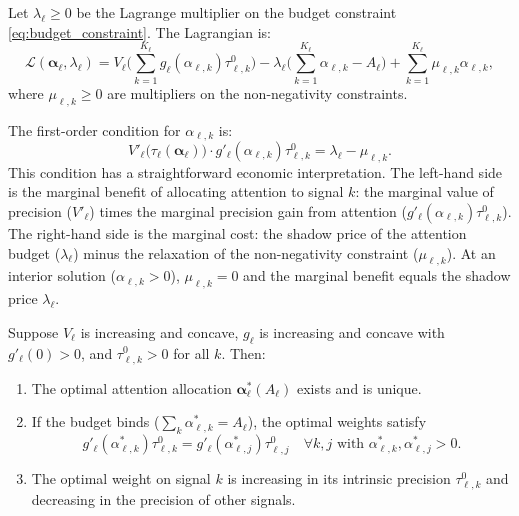 Let $\lambda_\ell \geq 0$ be the Lagrange multiplier on the budget constraint \eqref{eq:budget_constraint}. The Lagrangian is:
\begin{equation}\label{eq:lagrangian}
\mathcal{L}(\boldsymbol{\alpha}_\ell, \lambda_\ell) = V_\ell\Biggl(\sum_{k=1}^{K_\ell} g_\ell(\alpha_{\ell,k}) \tau^0_{\ell,k}\Biggr) - \lambda_\ell\Biggl(\sum_{k=1}^{K_\ell} \alpha_{\ell,k} - A_\ell\Biggr) + \sum_{k=1}^{K_\ell} \mu_{\ell,k} \alpha_{\ell,k},
\end{equation}
where $\mu_{\ell,k} \geq 0$ are multipliers on the non-negativity constraints.

The first-order condition for $\alpha_{\ell,k}$ is:
\begin{equation}\label{eq:foc}
V'_\ell\bigl(\tau_\ell(\boldsymbol{\alpha}_\ell)\bigr) \cdot g'_\ell(\alpha_{\ell,k}) \tau^0_{\ell,k} = \lambda_\ell - \mu_{\ell,k}.
\end{equation}
This condition has a straightforward economic interpretation. The left-hand side is the marginal benefit of allocating attention to signal $k$: the marginal value of precision ($V'_\ell$) times the marginal precision gain from attention ($g'_\ell(\alpha_{\ell,k}) \tau^0_{\ell,k}$). The right-hand side is the marginal cost: the shadow price of the attention budget ($\lambda_\ell$) minus the relaxation of the non-negativity constraint ($\mu_{\ell,k}$). At an interior solution ($\alpha_{\ell,k} > 0$), $\mu_{\ell,k} = 0$ and the marginal benefit equals the shadow price $\lambda_\ell$.

\begin{proposition}\label{prop:optimal_attention}
Suppose $V_\ell$ is increasing and concave, $g_\ell$ is increasing and concave with $g'_\ell(0) > 0$, and $\tau^0_{\ell,k} > 0$ for all $k$. Then:
\begin{enumerate}[label=(\roman*)]
\item The optimal attention allocation $\boldsymbol{\alpha}^*_\ell(A_\ell)$ exists and is unique.
\item If the budget binds ($\sum_k \alpha^*_{\ell,k} = A_\ell$), the optimal weights satisfy
\begin{equation}\label{eq:interior_foc}
g'_\ell(\alpha^*_{\ell,k}) \tau^0_{\ell,k} = g'_\ell(\alpha^*_{\ell,j}) \tau^0_{\ell,j} \quad \forall k,j \text{ with } \alpha^*_{\ell,k}, \alpha^*_{\ell,j} > 0.
\end{equation}
\item The optimal weight on signal $k$ is increasing in its intrinsic precision $\tau^0_{\ell,k}$ and decreasing in the precision of other signals.
\end{enumerate}
\end{proposition}

